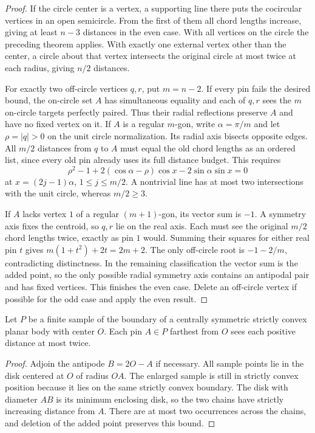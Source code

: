 \begin{proof}
If the circle center is a vertex, a supporting line there puts the cocircular vertices in an open semicircle. From the first of them all chord lengths increase, giving at least \(n-3\) distances in the even case. With all vertices on the circle the preceding theorem applies. With exactly one external vertex other than the center, a circle about that vertex intersects the original circle at most twice at each radius, giving \(n/2\) distances.

For exactly two off-circle vertices \(q,r\), put \(m=n-2\). If every pin fails the desired bound, the on-circle set \(A\) has simultaneous equality and each of \(q,r\) sees the \(m\) on-circle targets perfectly paired. Thus their radial reflections preserve \(A\) and have no fixed vertex on it.
If \(A\) is a regular \(m\)-gon, write \(\alpha=\pi/m\) and let \(\rho=|q|>0\) on the unit circle normalization. Its radial axis bisects opposite edges. All \(m/2\) distances from \(q\) to \(A\) must equal the old chord lengths as an ordered list, since every old pin already uses its full distance budget. This requires
\[
 \rho^2-1+2(\cos\alpha-\rho)\cos x-2\sin\alpha\sin x=0
\]
at \(x=(2j-1)\alpha\), \(1\le j\le m/2\). A nontrivial line has at most two intersections with the unit circle, whereas \(m/2\ge3\).

If \(A\) lacks vertex \(1\) of a regular \((m+1)\)-gon, its vector sum is \(-1\). A symmetry axis fixes the centroid, so \(q,r\) lie on the real axis. Each must see the original \(m/2\) chord lengths twice, exactly as pin \(1\) would. Summing their squares for either real pin \(t\) gives \(m(1+t^2)+2t=2m+2\). The only off-circle root is \(-1-2/m\), contradicting distinctness. In the remaining classification the vector sum is the added point, so the only possible radial symmetry axis contains an antipodal pair and has fixed vertices. This finishes the even case. Delete an off-circle vertex if possible for the odd case and apply the even result.
\end{proof}

\begin{theorem}[982-S01]
Let \(P\) be a finite sample of the boundary of a centrally symmetric strictly convex planar body with center \(O\). Each pin \(A\in P\) farthest from \(O\) sees each positive distance at most twice.
\end{theorem}

\begin{proof}
Adjoin the antipode \(B=2O-A\) if necessary. All sample points lie in the disk centered at \(O\) of radius \(OA\). The enlarged sample is still in strictly convex position because it lies on the same strictly convex boundary. The disk with diameter \(AB\) is its minimum enclosing disk, so the two chains have strictly increasing distance from \(A\). There are at most two occurrences across the chains, and deletion of the added point preserves this bound.
\end{proof}

